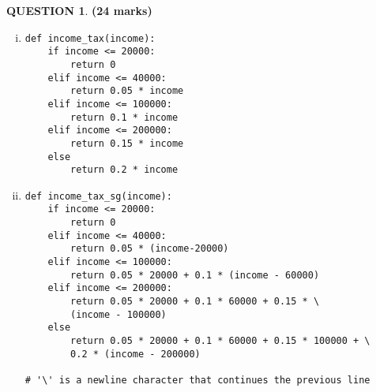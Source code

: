 \documentclass[a4paper,12pt]{article}
\theoremstyle{definition}
\newtheorem{ques}[dummy]{QUESTION}
\theoremstyle{plain}
\newcommand{\py}{python}
\begin{document}
\begin{ques}\hfill \textbf{(24 marks)}\\
	\begin{enumerate}[(i)]
		\item 
		\begin{verbatim}
def income_tax(income):
    if income <= 20000:
        return 0
    elif income <= 40000:
        return 0.05 * income
    elif income <= 100000:
        return 0.1 * income
    elif income <= 200000:
        return 0.15 * income
    else
        return 0.2 * income
		\end{verbatim}
		
		
		\item 
		\begin{verbatim}
def income_tax_sg(income):
    if income <= 20000:
        return 0
    elif income <= 40000:
        return 0.05 * (income-20000)
    elif income <= 100000:
        return 0.05 * 20000 + 0.1 * (income - 60000)
    elif income <= 200000:
        return 0.05 * 20000 + 0.1 * 60000 + 0.15 * \
        (income - 100000)
    else
        return 0.05 * 20000 + 0.1 * 60000 + 0.15 * 100000 + \ 
        0.2 * (income - 200000)

# '\' is a newline character that continues the previous line
		\end{verbatim}
	\end{enumerate}
\end{ques}
\end{document}
